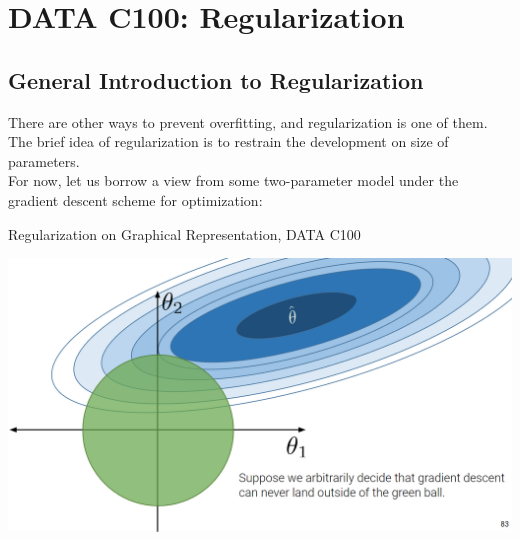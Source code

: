 \chapter{DATA C100: Regularization}

\section{General Introduction to Regularization}
There are other ways to prevent overfitting, and regularization is one of them. \\
The brief idea of regularization is to restrain the development on size of parameters. \\
For now, let us borrow a view from some two-parameter model under the gradient descent scheme for optimization:
\begin{ln-fig}{Regularization on Graphical Representation, DATA C100}{}
    \begin{center}
        \includegraphics[scale=0.2]{figs/ln07/lin-reg-regularize.png}
    \end{center}
\end{ln-fig}

